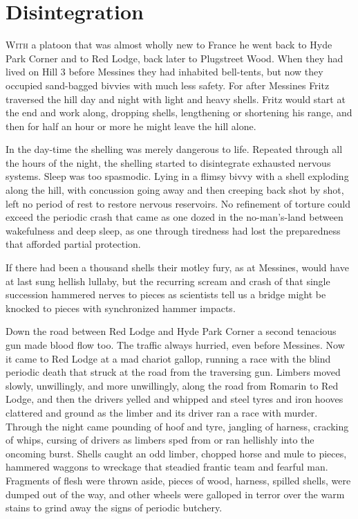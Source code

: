 \chapter*{\textsf{Disintegration}}

W\textsc{ith} a platoon that was almost wholly new to France he went back to Hyde Park Corner and to Red Lodge, back later to Plugstreet Wood. When they had lived on Hill 3 before Messines they had inhabited bell-tents, but now they occupied sand-bagged bivvies with much less safety. For after Messines Fritz traversed the hill day and night with light and heavy shells. Fritz would start at the end and work along, dropping shells, lengthening or shortening his range, and then for half an hour or more he might leave the hill alone.

In the day-time the shelling was merely dangerous to life. Repeated through all the hours of the night, the shelling started to disintegrate exhausted nervous systems. Sleep was too spasmodic. Lying in a flimsy bivvy with a shell exploding along the hill, with concussion going away and then creeping back shot by shot, left no period of rest to restore nervous reservoirs. No refinement of torture could exceed the periodic crash that came as one dozed in the no-man's-land between wakefulness and deep sleep, as one through tiredness had lost the preparedness that afforded partial protection.

If there had been a thousand shells their motley fury, as at Messines, would have at last sung hellish lullaby, but the recurring scream and crash of that single succession hammered nerves to pieces as scientists tell us a bridge might be knocked to pieces with synchronized hammer impacts.

Down the road between Red Lodge and Hyde Park Corner a second tenacious gun made blood flow too. The traffic always hurried, even before Messines. Now it came to Red Lodge at a mad chariot gallop, running a race with the blind periodic death that struck at the road from the traversing gun. Limbers moved slowly, unwillingly, and more unwillingly, along the road from Romarin to Red Lodge, and then the drivers yelled and whipped and steel tyres and iron hooves clattered and ground as the limber and its driver ran a race with murder. Through the night came pounding of hoof and tyre, jangling of harness, cracking of whips, cursing of drivers as limbers sped from or ran hellishly into the oncoming burst. Shells caught an odd limber, chopped horse and mule to pieces, hammered waggons to wreckage that steadied frantic team and fearful man. Fragments of flesh were thrown aside, pieces of wood, harness, spilled shells, were dumped out of the way, and other wheels were galloped in terror over the warm stains to grind away the signs of periodic butchery.

